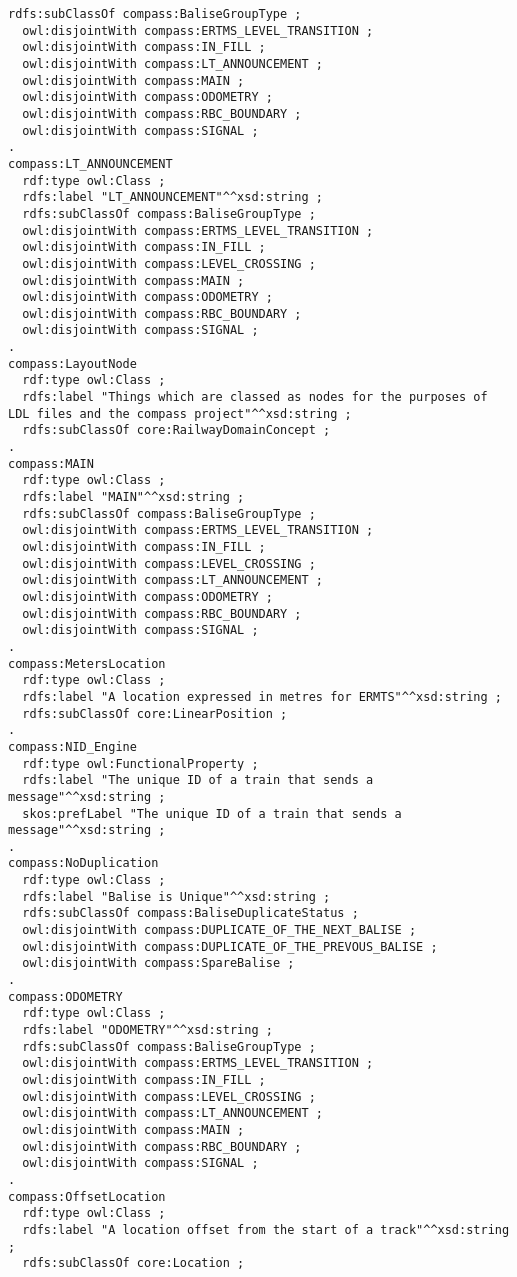 \begin{frame}[fragile]
\begin{lstlisting}[float=b,language=sparql,frame=tb,caption={Mapping of RaCoOn to COMPASS project data},label=lst:racooncompassmap]
  rdfs:subClassOf compass:BaliseGroupType ;
  owl:disjointWith compass:ERTMS_LEVEL_TRANSITION ;
  owl:disjointWith compass:IN_FILL ;
  owl:disjointWith compass:LT_ANNOUNCEMENT ;
  owl:disjointWith compass:MAIN ;
  owl:disjointWith compass:ODOMETRY ;
  owl:disjointWith compass:RBC_BOUNDARY ;
  owl:disjointWith compass:SIGNAL ;
.
compass:LT_ANNOUNCEMENT
  rdf:type owl:Class ;
  rdfs:label "LT_ANNOUNCEMENT"^^xsd:string ;
  rdfs:subClassOf compass:BaliseGroupType ;
  owl:disjointWith compass:ERTMS_LEVEL_TRANSITION ;
  owl:disjointWith compass:IN_FILL ;
  owl:disjointWith compass:LEVEL_CROSSING ;
  owl:disjointWith compass:MAIN ;
  owl:disjointWith compass:ODOMETRY ;
  owl:disjointWith compass:RBC_BOUNDARY ;
  owl:disjointWith compass:SIGNAL ;
.
compass:LayoutNode
  rdf:type owl:Class ;
  rdfs:label "Things which are classed as nodes for the purposes of LDL files and the compass project"^^xsd:string ;
  rdfs:subClassOf core:RailwayDomainConcept ;
.
compass:MAIN
  rdf:type owl:Class ;
  rdfs:label "MAIN"^^xsd:string ;
  rdfs:subClassOf compass:BaliseGroupType ;
  owl:disjointWith compass:ERTMS_LEVEL_TRANSITION ;
  owl:disjointWith compass:IN_FILL ;
  owl:disjointWith compass:LEVEL_CROSSING ;
  owl:disjointWith compass:LT_ANNOUNCEMENT ;
  owl:disjointWith compass:ODOMETRY ;
  owl:disjointWith compass:RBC_BOUNDARY ;
  owl:disjointWith compass:SIGNAL ;
.
compass:MetersLocation
  rdf:type owl:Class ;
  rdfs:label "A location expressed in metres for ERMTS"^^xsd:string ;
  rdfs:subClassOf core:LinearPosition ;
.
compass:NID_Engine
  rdf:type owl:FunctionalProperty ;
  rdfs:label "The unique ID of a train that sends a message"^^xsd:string ;
  skos:prefLabel "The unique ID of a train that sends a message"^^xsd:string ;
.
compass:NoDuplication
  rdf:type owl:Class ;
  rdfs:label "Balise is Unique"^^xsd:string ;
  rdfs:subClassOf compass:BaliseDuplicateStatus ;
  owl:disjointWith compass:DUPLICATE_OF_THE_NEXT_BALISE ;
  owl:disjointWith compass:DUPLICATE_OF_THE_PREVOUS_BALISE ;
  owl:disjointWith compass:SpareBalise ;
.
compass:ODOMETRY
  rdf:type owl:Class ;
  rdfs:label "ODOMETRY"^^xsd:string ;
  rdfs:subClassOf compass:BaliseGroupType ;
  owl:disjointWith compass:ERTMS_LEVEL_TRANSITION ;
  owl:disjointWith compass:IN_FILL ;
  owl:disjointWith compass:LEVEL_CROSSING ;
  owl:disjointWith compass:LT_ANNOUNCEMENT ;
  owl:disjointWith compass:MAIN ;
  owl:disjointWith compass:RBC_BOUNDARY ;
  owl:disjointWith compass:SIGNAL ;
.
compass:OffsetLocation
  rdf:type owl:Class ;
  rdfs:label "A location offset from the start of a track"^^xsd:string ;
  rdfs:subClassOf core:Location ;

\end{lstlisting}
\end{frame}
